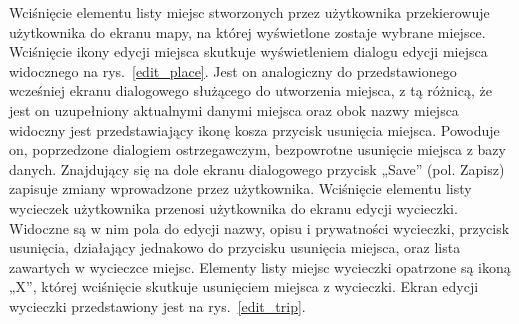         Wciśnięcie elementu listy miejsc stworzonych przez użytkownika przekierowuje użytkownika do ekranu mapy, na której wyświetlone zostaje wybrane miejsce.
        Wciśnięcie ikony edycji miejsca skutkuje wyświetleniem dialogu edycji miejsca widocznego na rys.~\ref{edit_place}. Jest on analogiczny do przedstawionego wcześniej 
        ekranu dialogowego służącego do utworzenia miejsca, z tą różnicą, że jest on uzupełniony aktualnymi danymi miejsca oraz obok nazwy miejsca widoczny jest 
        przedstawiający ikonę kosza przycisk usunięcia miejsca. Powoduje on, poprzedzone dialogiem ostrzegawczym, bezpowrotne usunięcie miejsca z bazy danych.
        Znajdujący się na dole ekranu dialogowego przycisk „Save” (pol. Zapisz) zapisuje zmiany wprowadzone przez użytkownika. Wciśnięcie elementu listy wycieczek
        użytkownika przenosi użytkownika do ekranu edycji wycieczki. Widoczne są w nim pola do edycji nazwy, opisu i prywatności wycieczki, przycisk usunięcia, działający
        jednakowo do przycisku usunięcia miejsca, oraz lista zawartych w wycieczce miejsc. Elementy listy miejsc wycieczki opatrzone są ikoną „X”, której wciśnięcie
        skutkuje usunięciem miejsca z wycieczki. Ekran edycji wycieczki przedstawiony jest na rys.~\ref{edit_trip}.

